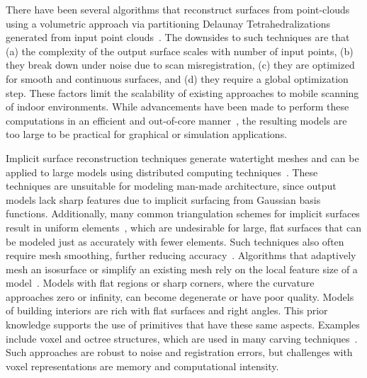 \documentclass[10pt,twocolumn,twoside]{IEEEtran}
\begin{document}
There have been several algorithms that reconstruct surfaces from point-clouds using a volumetric approach via partitioning Delaunay Tetrahedralizations generated from input point clouds~\cite{Powercrust,EigencrustShewchuk}.  The downsides to such techniques are that (a) the complexity of the output surface scales with number of input points, (b) they break down under noise due to scan misregistration, (c) they are optimized for smooth and continuous surfaces, and (d) they require a global optimization step.  These factors limit the scalability of existing approaches to mobile scanning of indoor environments.  While advancements have been made to perform these computations in an efficient and out-of-core manner~\cite{RealTimeEigenCrust,StreamingDelaunay}, the resulting models are too large to be practical for graphical or simulation applications.

Implicit surface reconstruction techniques generate watertight meshes and can be applied to large models using distributed computing techniques~\cite{Poisson,UnorganizedPoints,OutOfCorePoisson,ParallelPoisson}. These techniques are unsuitable for modeling man-made architecture, since output models lack sharp features due to implicit surfacing from Gaussian basis functions.  Additionally, many common triangulation schemes for implicit surfaces result in uniform elements~\cite{DualContouring,MarchingCubes}, which are undesirable for large, flat surfaces that can be modeled just as accurately with fewer elements.  Such techniques also often require mesh smoothing, further reducing accuracy~\cite{Carving}. Algorithms that adaptively mesh an isosurface or simplify an existing mesh rely on the local feature size of a model~\cite{QEM,ProgressiveMesh,Isostuffing,AdaptiveMeshing}.  Models with flat regions or sharp corners, where the curvature approaches zero or infinity, can become degenerate or have poor quality.  Models of building interiors are rich with flat surfaces and right angles.  This prior knowledge supports the use of primitives that have these same aspects.  Examples include voxel and octree structures, which are used in many carving techniques~\cite{OctreeSculpting,Carving,SpaceTime,VoxelSurfaceArea,Yang05,ParallelOctree}.  Such approaches are robust to noise and registration errors, but challenges with voxel representations are memory and computational intensity.
\end{document}
